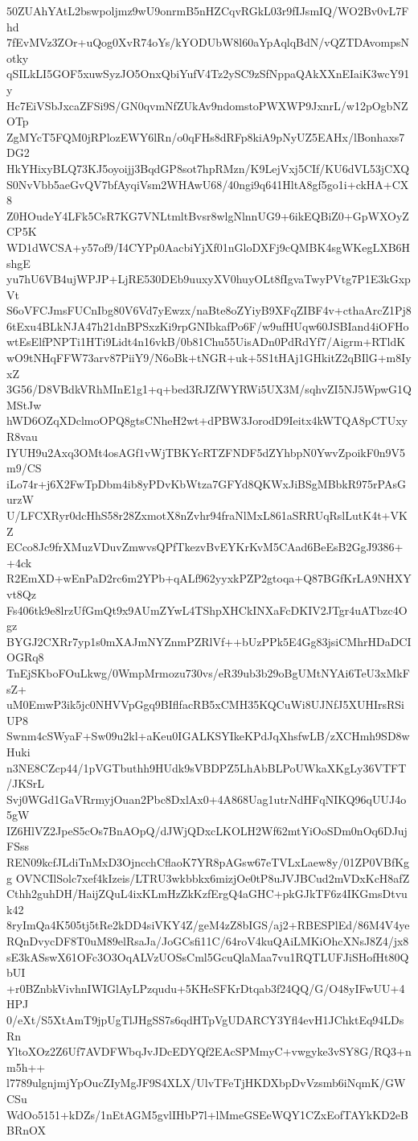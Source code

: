 50ZUAhYAtL2bswpoljmz9wU9onrmB5nHZCqvRGkL03r9fIJsmIQ/WO2Bv0vL7Fhd
7fEvMVz3ZOr+uQog0XvR74oYs/kYODUbW8l60aYpAqlqBdN/vQZTDAvompsNotky
qSILkLI5GOF5xuwSyzJO5OnxQbiYufV4Tz2ySC9zSfNppaQAkXXnEIaiK3wcY91y
Hc7EiVSbJxcaZFSi9S/GN0qvmNfZUkAv9ndomstoPWXWP9JxnrL/w12pOgbNZOTp
ZgMYcT5FQM0jRPlozEWY6lRn/o0qFHs8dRFp8kiA9pNyUZ5EAHx/lBonhaxs7DG2
HkYHixyBLQ73KJ5oyoijj3BqdGP8sot7hpRMzn/K9LejVxj5CIf/KU6dVL53jCXQ
S0NvVbb5aeGvQV7bfAyqiVsm2WHAwU68/40ngi9q641HltA8gf5go1i+ckHA+CX8
Z0HOudeY4LFk5CsR7KG7VNLtmltBvsr8wlgNlnnUG9+6ikEQBiZ0+GpWXOyZCP5K
WD1dWCSA+y57of9/I4CYPp0AacbiYjXf01nGloDXFj9cQMBK4sgWKegLXB6HshgE
yu7hU6VB4ujWPJP+LjRE530DEb9uuxyXV0huyOLt8fIgvaTwyPVtg7P1E3kGxpVt
S6oVFCJmsFUCnIbg80V6Vd7yEwzx/naBte8oZYiyB9XFqZIBF4v+cthaArcZ1Pj8
6tExu4BLkNJA47h21dnBPSxzKi9rpGNIbkafPo6F/w9ufHUqw60JSBIand4iOFHo
wtEsElfPNPTi1HTi9Lidt4n16vkB/0b81Chu55UisADn0PdRdYf7/Aigrm+RTldK
wO9tNHqFFW73arv87PiiY9/N6oBk+tNGR+uk+5S1tHAj1GHkitZ2qBIlG+m8IyxZ
3G56/D8VBdkVRhMInE1g1+q+bed3RJZfWYRWi5UX3M/sqhvZI5NJ5WpwG1QMStJw
hWD6OZqXDclmoOPQ8gtsCNheH2wt+dPBW3JorodD9Ieitx4kWTQA8pCTUxyR8vau
IYUH9u2Axq3OMt4osAGf1vWjTBKYcRTZFNDF5dZYhbpN0YwvZpoikF0n9V5m9/CS
iLo74r+j6X2FwTpDbm4ib8yPDvKbWtza7GFYd8QKWxJiBSgMBbkR975rPAsGurzW
U/LFCXRyr0dcHhS58r28ZxmotX8nZvhr94fraNlMxL861aSRRUqRslLutK4t+VKZ
ECco8Jc9frXMuzVDuvZmwvsQPfTkezvBvEYKrKvM5CAad6BeEsB2GgJ9386++4ck
R2EmXD+wEnPaD2rc6m2YPb+qALf962yyxkPZP2gtoqa+Q87BGfKrLA9NHXYvt8Qz
Fs406tk9e8lrzUfGmQt9x9AUmZYwL4TShpXHCkINXaFcDKIV2JTgr4uATbzc4Ogz
BYGJ2CXRr7yp1s0mXAJmNYZnmPZRlVf++bUzPPk5E4Gg83jsiCMhrHDaDCIOGRq8
TnEjSKboFOuLkwg/0WmpMrmozu730vs/eR39ub3b29oBgUMtNYAi6TeU3xMkFsZ+
uM0EmwP3ik5jc0NHVVpGgq9BIflfacRB5xCMH35KQCuWi8UJNfJ5XUHIrsRSiUP8
Swnm4cSWyaF+Sw09u2kl+aKeu0IGALKSYIkeKPdJqXhsfwLB/zXCHmh9SD8wHuki
n3NE8CZcp44/1pVGTbuthh9HUdk9sVBDPZ5LhAbBLPoUWkaXKgLy36VTFT/JKSrL
Svj0WGd1GaVRrmyjOuan2Pbc8DxlAx0+4A868Uag1utrNdHFqNIKQ96qUUJ4o5gW
IZ6HlVZ2JpeS5cOs7BnAOpQ/dJWjQDxcLKOLH2Wf62mtYiOoSDm0nOq6DJujFSss
REN09kcfJLdiTnMxD3OjncchCflaoK7YR8pAGsw67eTVLxLaew8y/01ZP0VBfKgg
OVNCIlSolc7xef4kIzeis/LTRU3wkbbkx6mizjOe0tP8uJVJBCud2mVDxKcH8afZ
Cthh2guhDH/HaijZQuL4ixKLmHzZkKzfErgQ4aGHC+pkGJkTF6z4IKGmsDtvuk42
8ryImQa4K505tj5tRe2kDD4siVKY4Z/geM4zZ8bIGS/aj2+RBESPlEd/86M4V4ye
RQnDvycDF8T0uM89elRsaJa/JoGCsfi11C/64roV4kuQAiLMKiOhcXNsJ8Z4/jx8
sE3kASswX61OFc3O3OqALVzUOSsCml5GcuQlaMaa7vu1RQTLUFJiSHofHt80QbUI
+r0BZnbkVivhnIWIGlAyLPzqudu+5KHeSFKrDtqab3f24QQ/G/O48yIFwUU+4HPJ
0/eXt/S5XtAmT9jpUgTlJHgSS7s6qdHTpVgUDARCY3Yfl4evH1JChktEq94LDsRn
YltoXOz2Z6Uf7AVDFWbqJvJDcEDYQf2EAcSPMmyC+vwgyke3vSY8G/RQ3+nm5h++
l7789ulgnjmjYpOucZIyMgJF9S4XLX/UlvTFeTjHKDXbpDvVzsmb6iNqmK/GWCSu
WdOo5151+kDZs/1nEtAGM5gvlIHbP7l+lMmeGSEeWQY1CZxEofTAYkKD2eBBRnOX
